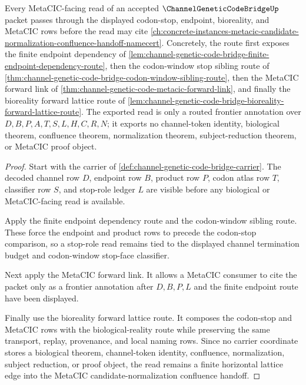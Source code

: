 \begin{theorem}
\label{thm:channel-genetic-code-bridge-metacic-forward-route}
Every MetaCIC-facing read of an accepted $\ChannelGeneticCodeBridgeUp$ packet passes through the displayed codon-stop, endpoint, bioreality, and MetaCIC rows before the read may cite \autoref{ch:concrete-instances-metacic-candidate-normalization-confluence-handoff-namecert}. Concretely, the route first exposes the finite endpoint dependency of \autoref{lem:channel-genetic-code-bridge-finite-endpoint-dependency-route}, then the codon-window stop sibling route of \autoref{thm:channel-genetic-code-bridge-codon-window-sibling-route}, then the MetaCIC forward link of \autoref{thm:channel-genetic-code-metacic-forward-link}, and finally the bioreality forward lattice route of \autoref{lem:channel-genetic-code-bridge-bioreality-forward-lattice-route}. The exported read is only a routed frontier annotation over $D,B,P,A,T,S,L,H,C,R,N$; it exports no channel-token identity, biological theorem, confluence theorem, normalization theorem, subject-reduction theorem, or MetaCIC proof object.
\end{theorem}
\begin{proof}
Start with the carrier of \autoref{def:channel-genetic-code-bridge-carrier}. The decoded channel row $D$, endpoint row $B$, product row $P$, codon atlas row $T$, classifier row $S$, and stop-role ledger $L$ are visible before any biological or MetaCIC-facing read is available.

Apply the finite endpoint dependency route and the codon-window sibling route. These force the endpoint and product rows to precede the codon-stop comparison, so a stop-role read remains tied to the displayed channel termination budget and codon-window stop-face classifier.

Next apply the MetaCIC forward link. It allows a MetaCIC consumer to cite the packet only as a frontier annotation after $D,B,P,L$ and the finite endpoint route have been displayed.

Finally use the bioreality forward lattice route. It composes the codon-stop and MetaCIC rows with the biological-reality route while preserving the same transport, replay, provenance, and local naming rows. Since no carrier coordinate stores a biological theorem, channel-token identity, confluence, normalization, subject reduction, or proof object, the read remains a finite horizontal lattice edge into the MetaCIC candidate-normalization confluence handoff.
\end{proof}
